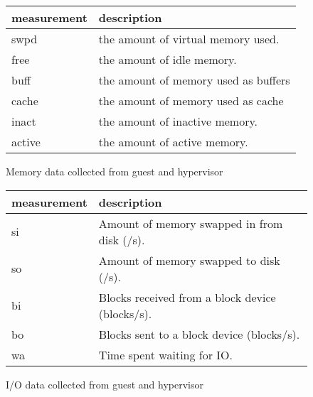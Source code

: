 \begin{figure}[h!]
\begin{tabular}{ l p{5cm} }
       measurement & description \\
       \hline
       swpd  & the amount of virtual memory used. \\
       free  & the amount of idle memory. \\
       buff  & the amount of memory used as buffers \\
       cache & the amount of memory used as cache \\
       inact & the amount of inactive memory. \\
       active & the amount of active memory. \\
\end{tabular}
\caption{Memory data collected from guest and hypervisor}
\label{fig:memory}
\end{figure}

\begin{figure}[h!]
\begin{tabular}{ l p{5cm} }
       measurement & description \\
       \hline
       si & Amount of memory swapped in from disk (/s). \\
       so & Amount of memory swapped to disk (/s). \\
       bi & Blocks received from a block device (blocks/s). \\
       bo & Blocks sent to a block device (blocks/s). \\
       wa & Time spent waiting for IO. \\
\end{tabular}
\caption{I/O data collected from guest and hypervisor}
\label{fig:io}
\end{figure}



